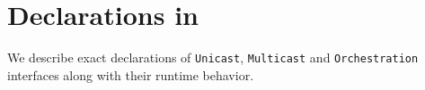 \documentclass[letterpaper,twocolumn,10pt]{article}
\begin{document}
\clearpage




\appendix
\section{Declarations in \uarch}
\label{appendix:section:micro-switch-architecture}
We describe exact declarations of \texttt{Unicast}, 
\texttt{Multicast} and \texttt{Orchestration} interfaces along with 
their runtime behavior. 

%   
\end{document}
